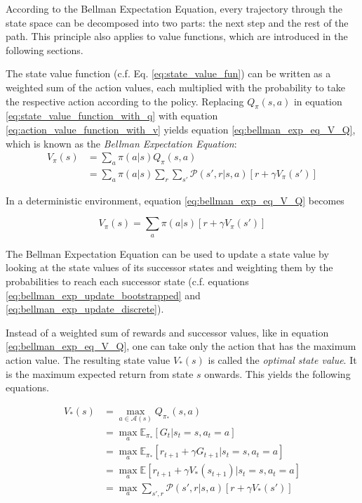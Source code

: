 According to the Bellman Expectation Equation, every trajectory through the state space can be decomposed into two parts: the next step and the rest of the path. This principle also applies to value functions, which are introduced in the following sections.

The state value function (c.f. Eq. \ref{eq:state_value_fun}) can be written as a weighted sum of the action values, each multiplied with the probability to take the respective action according to the policy. Replacing $Q_\pi(s,a)$ in equation \ref{eq:state_value_function_with_q} with equation \ref{eq:action_value_function_with_v} yields equation \ref{eq:bellman_exp_eq_V_Q}, which is known as the \textit{Bellman Expectation Equation}:
\begin{align}
V_\pi(s)&=\sum_a \pi(a|s)Q_\pi(s,a)\\ &= \sum_a \pi(a|s)\sum_r \sum_{s'} \mathcal{P}(s',r|s,a)[r+\gamma V_{\pi}(s')]
\label{eq:bellman_exp_eq_V_Q}
\end{align}

In a deterministic environment, equation \ref{eq:bellman_exp_eq_V_Q} becomes

\begin{equation}
V_\pi(s)= \sum_a \pi(a|s)[r+\gamma V_{\pi}(s')]
\label{eq:bellman_exp_eq_V_determinisic}
\end{equation}

The Bellman Expectation Equation can be used to update a state value by looking at the state values of its successor states and weighting them by the probabilities to reach each successor state (c.f. equations \ref{eq:bellman_exp_update_bootstrapped} and \ref{eq:bellman_exp_update_discrete}).

Instead of a weighted sum of rewards and successor values, like in equation \ref{eq:bellman_exp_eq_V_Q}, one can take only the action that has the maximum action value. The resulting state value $V_*(s)$ is called the \textit{optimal state value}. It is the maximum expected return from state $s$ onwards. This yields the following equations. 

\begin{align}
V_*(s)&=\max_{a \in \mathcal{A}(s)} Q_{\pi_*}(s,a) \label{eq:bellman_optimality_equation_v_with_q}\\
&=\max_{a}\mathbb{E}_{\pi_*}[G_t|s_t=s,a_t=a]\\
&=\max_{a}\mathbb{E}_{\pi_*}[r_{t+1} + \gamma G_{t+1}|s_t=s,a_t=a]\\
&=\max_{a}\mathbb{E}[r_{t+1} + \gamma V_*(s_{t+1})|s_t=s,a_t=a]\\
&=\max_{a}\sum_{s',r}\mathcal{P}(s',r|s,a)[r + \gamma V_*(s')]
\label{eq:bellman_optimality_equation_stochastic}
\end{align}


